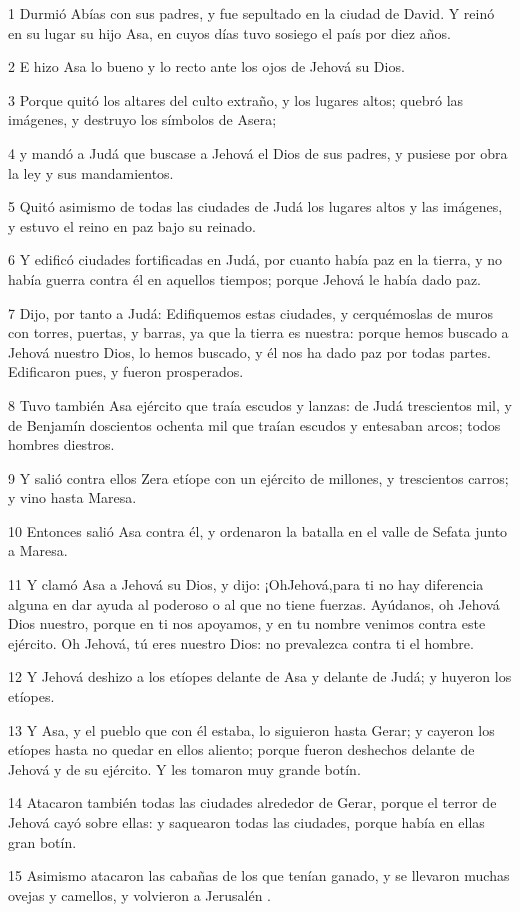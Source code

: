 \par 1 Durmió Abías con sus padres, y fue sepultado en la ciudad de David. Y reinó en su lugar su hijo Asa, en cuyos días tuvo sosiego el país por diez años.
\par 2 E hizo Asa lo bueno y lo recto ante los ojos de Jehová su Dios.
\par 3 Porque quitó los altares del culto extraño, y los lugares altos; quebró las imágenes, y destruyo los símbolos de Asera;
\par 4 y mandó a Judá que buscase a Jehová el Dios de sus padres, y pusiese por obra la ley y sus mandamientos.
\par 5 Quitó asimismo de todas las ciudades de Judá los lugares altos y las imágenes, y estuvo el reino en paz bajo su reinado. 
\par 6 Y edificó ciudades fortificadas en Judá, por cuanto había paz en la tierra, y no había guerra contra él en aquellos tiempos; porque Jehová le había dado paz.
\par 7 Dijo, por tanto a Judá: Edifiquemos estas ciudades, y cerquémoslas de muros con torres, puertas, y barras, ya que la tierra es nuestra: porque hemos buscado a Jehová nuestro Dios, lo hemos buscado, y él nos ha dado paz por todas partes. Edificaron pues, y fueron prosperados.
\par 8 Tuvo también Asa ejército que traía escudos y lanzas: de Judá trescientos mil, y de Benjamín doscientos ochenta mil que traían escudos y entesaban arcos; todos hombres diestros.
\par 9 Y salió contra ellos Zera etíope con un ejército de millones, y trescientos carros; y vino hasta Maresa.
\par 10 Entonces salió Asa contra él, y ordenaron la batalla en el valle de Sefata junto a Maresa.
\par 11 Y clamó Asa a Jehová su Dios, y dijo: ¡OhJehová,para ti no hay diferencia alguna en dar ayuda al poderoso o al que no tiene fuerzas. Ayúdanos, oh Jehová Dios nuestro, porque en ti nos apoyamos, y en tu nombre venimos contra este ejército. Oh Jehová, tú eres nuestro Dios: no prevalezca contra ti el hombre.
\par 12 Y Jehová deshizo a los etíopes delante de Asa y delante de Judá; y huyeron los etíopes.
\par 13 Y Asa, y el pueblo que con él estaba, lo siguieron hasta Gerar; y cayeron los etíopes hasta no quedar en ellos aliento; porque fueron deshechos delante de Jehová y de su ejército. Y les tomaron muy grande botín.
\par 14 Atacaron también todas las ciudades alrededor de Gerar, porque el terror de Jehová cayó sobre ellas: y saquearon todas las ciudades, porque había en ellas gran botín.
\par 15 Asimismo atacaron las cabañas de los que tenían ganado, y se llevaron muchas ovejas y camellos, y volvieron a Jerusalén .

